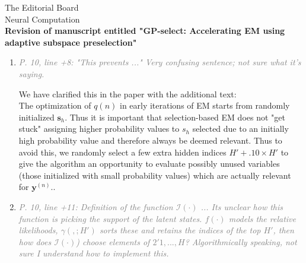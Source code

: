 \documentclass[10pt]{letter}
\newcommand{\rvr}[1]{\textcolor{gray}{#1}}
\renewcommand{\vec}[1]{{\mathbf{#1}}}
\newcommand{\II}{{\cal I}}
\begin{document}
\begin{letter}{
The Editorial Board\\
Neural Computation\\
\vspace{10mm}
\textbf{Revision of manuscript entitled "GP-select: Accelerating EM using adaptive
subspace preselection"}
}
\begin{enumerate}[topsep=3pt,itemsep=2ex,partopsep=1ex,parsep=1ex]
To see this, consider the full joint $p(s_1,...s_h \,|\, y,\Theta)$ in the case when a subset of latents has values clamped to zero, i.e., $s_h=0$ for all $h\not\in\II$ (compare Eq. (2)). We can then ask what the overall joint posterior mass is in this case. If we suppose the latents to be conditionally independent, this total mass is given by a product of marginals as follows:

\begin{equation}
\label{eq:marginals-product}
\sum_{\vec{s}\; \text{with}\; s_h=0 \;\text{for all}\; h\not\in\II} p(s_1,...s_H \, | \, \vec{y}, \Theta) = \prod_{h\not\in\II} (1 - p(s_h=1 \,|\, \vec{y}, \Theta)).
\end{equation} 

We want this mass to be as large as possible as its complement is the posterior mass that we discard with our approximation. If the affinity function correctly estimates the marginals $p(s_h=1 \,|\, \vec{y}, \Theta)$, then discarding those $(H-H')$ marginals with lowest values is equivalent to discarding the space with the least posterior mass (compared to discarding w.r.t. all alternative choices with the same number of latents). 




    \item \rvr{\emph{P. 10, line +8: "This prevents ..."  Very confusing sentence; not sure what it's saying.}}

We have clarified this in the paper with the additional text:\\
The optimization of $q(n)$ in early iterations of EM starts from randomly initialized $\vec{s}_h$. Thus it is important that selection-based EM does not "get stuck" assigning higher probability values to $s_h$ selected due to an initially high probability value and therefore always be deemed relevant. Thus to avoid this, we randomly select a few extra hidden indices $H' + .10\times H'$ to give the algorithm an opportunity to evaluate possibly unused variables (those initialized with small probability values) which are actually relevant for $\vec{y}^{(n)}$..


    \item \rvr{\emph{P. 10, line +11: Definition of the function $\mathcal{I}( \cdot )$ ... Its unclear how this function is picking the support of the latent states. $f( \cdot )$ models the relative likelihoods, $\gamma( , ; H' )$ sorts these and retains the indices of the top $H'$, then how does $\mathcal{I}( \cdot )$) choose elements of $2'{1 ,...,H}$? Algorithmically speaking, not sure I understand how to implement this.}}


\end{enumerate}
\end{letter}
\end{document}
